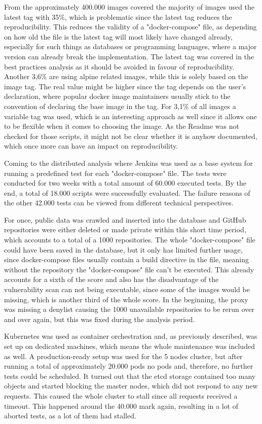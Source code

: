 From the approximately 400.000 images covered the majority of images used the latest tag with 35\%, which is problematic since the latest tag reduces the reproducibility. This reduces the validity of a "docker-compose" file, as depending on how old the file is the latest tag will most likely have changed already, especially for such things as databases or programming languages, where a major version can already break the implementation. The latest tag was covered in the best practices analysis as it should be avoided in favour of reproducibility.
Another 3,6\% are using alpine related images, while this is solely based on the image tag. The real value might be higher since the tag depends on the user's declaration, where popular docker image maintainers usually stick to the convention of declaring the base image in the tag.
For 3,1\% of all images a variable tag was used, which is an interesting approach as well since it allows one to be flexible when it comes to choosing the image. As the Readme was not checked for those scripts, it might not be clear whether it is anyhow documented, which once more can have an impact on reproducibility.

Coming to the distributed analysis where Jenkins was used as a base system for running a predefined test for each "docker-compose" file. The tests were conducted for two weeks with a total amount of 60.000 executed tests. By the end, a total of 18.000 scripts were successfully evaluated. The failure reasons of the other 42.000 tests can be viewed from different technical perspectives.

For once, public data was crawled and inserted into the database and GitHub repositories were either deleted or made private within this short time period, which accounts to a total of a 1000 repositories. The whole "docker-compose" file could have been saved in the database, but it only has limited further usage, since docker-compose files usually contain a build directive in the file, meaning without the repository the "docker-compose" file can't be executed. This already accounts for a sixth of the score and also has the disadvantage of the vulnerability scan can not being executable, since some of the images would be missing, which is another third of the whole score. In the beginning, the proxy was missing a denylist causing the 1000 unavailable repositories to be rerun over and over again, but this was fixed during the analysis period.

Kubernetes was used as container orchestration and, as previously described, was set up on dedicated machines, which means the whole maintenance was included as well. A production-ready setup was used for the 5 nodes cluster, but after running a total of approximately 20.000 pods no pods and, therefore, no further tests could be scheduled. It turned out that the etcd storage contained too many objects and started blocking the master nodes, which did not respond to any new requests. This caused the whole cluster to stall since all requests received a timeout. This happened around the 40.000 mark again, resulting in a lot of aborted tests, as a lot of them had stalled.

